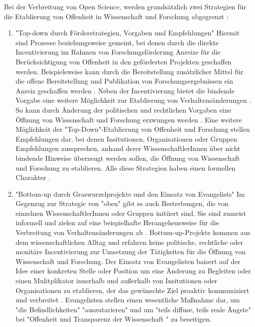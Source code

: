 Bei der Verbreitung von Open Science, werden grundsätzlich zwei Strategien für die Etablierung von Offenheit in Wissenschaft und Forschung abgegrenzt \cite{schulze_2013_open}: 
\begin{enumerate}
\item "Top-down durch Förderstrategien, Vorgaben und Empfehlungen"
Hiermit sind Prozesse beziehungsweise gemeint, bei denen durch die direkte Incentivierung im Rahmen von Forschungsförderung Anreize für die Berücksichtigung von Offenheit in den geförderten Projekten geschaffen werden. Beispielsweise kann durch die Bereitstellung zusätzlicher Mittel für die offene Bereitstellung und Publikation von Forschungsergebnissen ein Anreiz geschaffen werden  \cite{suchen}. Neben der Incentivierung bietet die bindende Vorgabe eine weitere Möglichkeit zur Etablierung von Verhaltensänderungen \cite{suchen}. So kann durch Änderung der politischen und rechtlichen Vorgaben eine Öffnung von Wissenschaft und Forschung erzwungen werden \cite{suchen}. Eine weitere Möglichkeit der "Top-Down"-Etablierung von Offenheit und Forschung stellen Empfehlungen dar, bei denen Insitutionen, Organisationen oder Gruppen Empfehlungen aussprechen, anhand derer WissenschaftlerInnen über nicht bindende Hinweise überzeugt werden sollen, die Öffnung von Wissenschaft und Forschung zu etablieren. Alle diese Strategien haben einen formellen Charakter \cite{suchen}.
\item "Bottom-up durch Graswurzelprojekte und den Einsatz von Evangelists"
Im Gegenzug zur Strategie von "oben" gibt es auch Bestrebungen, die von einzelnen WissenschaftlerInnen oder Gruppen initiiert sind. Sie sind zumeist informell und zielen auf eine beispielhafte Herangehensweise für die Verbreitung von Verhaltensänderungen ab \cite{suchen}. Bottum-up-Projekte kommen aus dem wissenschaftlichen Alltag und erfahren keine politische, rechtliche oder monitäre Incentivierung zur Umsetzung der Tätigkeiten für die Öffnung von Wissenschaft und Forschung. Der Einsatz von Evangelisten baisert auf der Idee einer konkreten Stelle oder Position um eine Änderung zu Begleiten \cite{suchen} oder einen Mulitplikator innerhalb und außerhalb von Insitutionen oder Organisationen zu etablieren, der das gewünschte Ziel proaktiv kommuniziert und verbreitet \cite{suchen}. Evangelisten stellen einen wesentliche Maßnahme dar, um "die Befindlichkeiten" "auszutarieren" und um "teils diffuse, teils reale Ängste" bei "Offenheit und Transparenz der Wissenschaft "\cite{schulze_2013_open} zu beseitigen.
\end{enumerate} 

